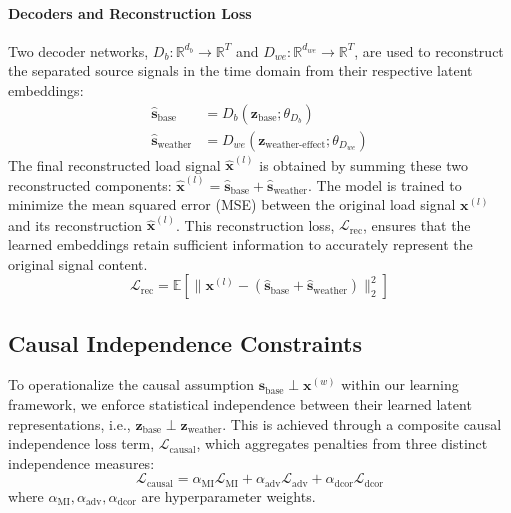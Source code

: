 \documentclass[journal]{IEEEtran}
\begin{document}
\paragraph{Decoders and Reconstruction Loss}
Two decoder networks, $D_b: \mathbb{R}^{d_b} \to \mathbb{R}^T$ and $D_{we}: \mathbb{R}^{d_{we}} \to \mathbb{R}^T$, are used to reconstruct the separated source signals in the time domain from their respective latent embeddings:
\begin{align}
\hat{\mathbf{s}}_{\text{base}} &= D_b(\mathbf{z}_{\text{base}}; \theta_{D_b}) \\
\hat{\mathbf{s}}_{\text{weather}} &= D_{we}(\mathbf{z}_{\text{weather-effect}}; \theta_{D_{we}})
\end{align}
The final reconstructed load signal $\hat{\mathbf{x}}^{(l)}$ is obtained by summing these two reconstructed components: $\hat{\mathbf{x}}^{(l)} = \hat{\mathbf{s}}_{\text{base}} + \hat{\mathbf{s}}_{\text{weather}}$. The model is trained to minimize the mean squared error (MSE) between the original load signal $\mathbf{x}^{(l)}$ and its reconstruction $\hat{\mathbf{x}}^{(l)}$. This reconstruction loss, $\mathcal{L}_{\text{rec}}$, ensures that the learned embeddings retain sufficient information to accurately represent the original signal content.
\begin{equation}
\mathcal{L}_{\text{rec}} = \mathbb{E} \left[ \|\mathbf{x}^{(l)} - (\hat{\mathbf{s}}_{\text{base}} + \hat{\mathbf{s}}_{\text{weather}})\|_2^2 \right]
\end{equation}

\subsection{Causal Independence Constraints}
To operationalize the causal assumption $\mathbf{s}_{\text{base}} \perp \mathbf{x}^{(w)}$ within our learning framework, we enforce statistical independence between their learned latent representations, i.e., $\mathbf{z}_{\text{base}} \perp \mathbf{z}_{\text{weather}}$. This is achieved through a composite causal independence loss term, $\mathcal{L}_{\text{causal}}$, which aggregates penalties from three distinct independence measures:
\begin{equation}
\mathcal{L}_{\text{causal}} = \alpha_{\text{MI}}\mathcal{L}_{\text{MI}} + \alpha_{\text{adv}}\mathcal{L}_{\text{adv}} + \alpha_{\text{dcor}}\mathcal{L}_{\text{dcor}}
\end{equation}
where $\alpha_{\text{MI}}, \alpha_{\text{adv}}, \alpha_{\text{dcor}}$ are hyperparameter weights.
\end{document}
